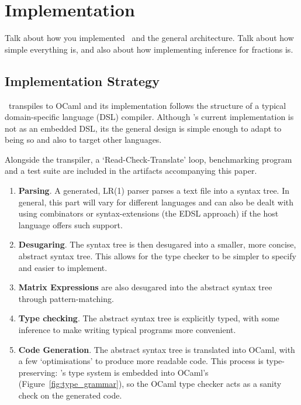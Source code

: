 \section{Implementation}\label{sec:implementation}

Talk about how you implemented \lang\ and the general
architecture. Talk about how simple everything is, and also
about how implementing inference for fractions is.

\subsection{Implementation Strategy}

\lang\ transpiles to OCaml and its implementation follows the structure of a
typical domain-specific language (DSL) compiler. Although \lang's current
implementation is not as an embedded DSL, its the general design is simple enough
to adapt to being so and also to target other languages.

Alongside the transpiler, a `Read-Check-Translate' loop, benchmarking program
and a test suite are included in the artifacts accompanying this paper.

\begin{enumerate}

    \item \textbf{Parsing}. A generated, LR(1) parser parses a text file into a
        syntax tree. In general, this part will vary for different languages
        and can also be dealt with using combinators or syntax-extensions (the
        EDSL approach) if the host language offers such support.

    \item \textbf{Desugaring}. The syntax tree is then desugared into a
        smaller, more concise, abstract syntax tree. This allows for the type
        checker to be simpler to specify and easier to implement.

    \item \textbf{Matrix Expressions} are also desugared into the abstract
        syntax tree through pattern-matching.

    \item \textbf{Type checking}. The abstract syntax tree is explicitly typed,
        with some inference to make writing typical programs more convenient.

    \item \textbf{Code Generation}. The abstract syntax tree is translated into
        OCaml, with a few `optimisations' to produce more readable code. This
        process is type-preserving: \lang's type system is embedded into
        OCaml's (Figure~\ref{fig:type_grammar}), so the OCaml type checker
        acts as a sanity check on the generated code.

\end{enumerate}

